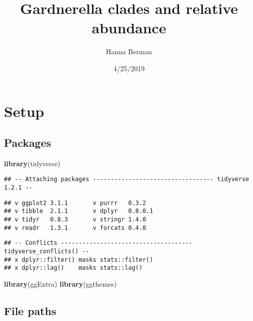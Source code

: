 \documentclass[]{article}
\title{Gardnerella clades and relative abundance}
\author{Hanna Berman}
\date{4/25/2019}
\newenvironment{Shaded}{\begin{snugshade}}{\end{snugshade}}
\newcommand{\KeywordTok}[1]{\textcolor[rgb]{0.13,0.29,0.53}{\textbf{{#1}}}}
\newcommand{\DataTypeTok}[1]{\textcolor[rgb]{0.13,0.29,0.53}{{#1}}}
\newcommand{\CharTok}[1]{\textcolor[rgb]{0.31,0.60,0.02}{{#1}}}
\newcommand{\StringTok}[1]{\textcolor[rgb]{0.31,0.60,0.02}{{#1}}}
\newcommand{\NormalTok}[1]{{#1}}
\begin{document}
\maketitle

\section{Setup}\label{setup}

\subsection{Packages}\label{packages}

\begin{Shaded}
\begin{Highlighting}[]
\KeywordTok{library}\NormalTok{(tidyverse)}
\end{Highlighting}
\end{Shaded}

\begin{verbatim}
## -- Attaching packages ---------------------------------- tidyverse 1.2.1 --
\end{verbatim}

\begin{verbatim}
## v ggplot2 3.1.1       v purrr   0.3.2  
## v tibble  2.1.1       v dplyr   0.8.0.1
## v tidyr   0.8.3       v stringr 1.4.0  
## v readr   1.3.1       v forcats 0.4.0
\end{verbatim}

\begin{verbatim}
## -- Conflicts ------------------------------------- tidyverse_conflicts() --
## x dplyr::filter() masks stats::filter()
## x dplyr::lag()    masks stats::lag()
\end{verbatim}

\begin{Shaded}
\begin{Highlighting}[]
\KeywordTok{library}\NormalTok{(ggExtra)}
\KeywordTok{library}\NormalTok{(ggthemes)}
\end{Highlighting}
\end{Shaded}

\subsection{File paths}\label{file-paths}

\begin{Shaded}
\end{Shaded}
\end{document}
